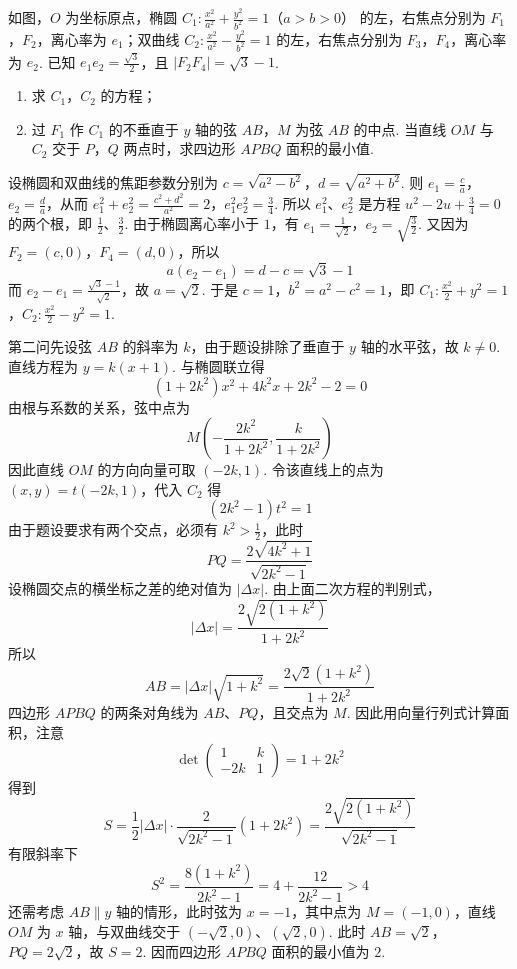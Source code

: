 \begin{problem}
如图，\(O\) 为坐标原点，椭圆 \(C_1: \frac{x^2}{a^2} + \frac{y^2}{b^2} = 1\)（\(a > b > 0\)） 的左，右焦点分别为 \(F_1\)，\(F_2\)，离心率为 \(e_1\)；双曲线 \(C_2: \frac{x^2}{a^2} - \frac{y^2}{b^2} = 1\) 的左，右焦点分别为 \(F_3\)，\(F_4\)，离心率为 \(e_2\). 已知 \(e_1 e_2 = \frac{\sqrt{3}}{2}\)，且 \(|F_2 F_4| = \sqrt{3} - 1\).

\begin{enumerate}
\item 求 \(C_{1}\)，\(C_{2}\) 的方程；
\item 过 \(F_{1}\) 作 \(C_{1}\) 的不垂直于 \(y\) 轴的弦 \(AB\)，\(M\) 为弦 \(AB\) 的中点. 当直线 \(OM\) 与 \(C_{2}\) 交于 \(P\)，\(Q\) 两点时，求四边形 \(APBQ\) 面积的最小值.
\end{enumerate}


\begin{solution}
设椭圆和双曲线的焦距参数分别为
\(c=\sqrt{a^2-b^2}\)，\(d=\sqrt{a^2+b^2}\).
则 \(e_1=\frac{c}{a}\)，\(e_2=\frac{d}{a}\)，从而
\(e_1^2+e_2^2=\frac{c^2+d^2}{a^2}=2\)，\(e_1^2e_2^2=\frac34\).
所以 \(e_1^2\)、\(e_2^2\) 是方程 \(u^2-2u+\frac34=0\) 的两个根，即 \(\frac12\)、\(\frac32\). 由于椭圆离心率小于 \(1\)，有
\(e_1=\frac{1}{\sqrt2}\)，\(e_2=\sqrt{\frac32}\).
又因为 \(F_2=(c,0)\)，\(F_4=(d,0)\)，所以
\[
a(e_2-e_1)=d-c=\sqrt3-1
\]
而 \(e_2-e_1=\frac{\sqrt3-1}{\sqrt2}\)，故 \(a=\sqrt2\). 于是 \(c=1\)，\(b^2=a^2-c^2=1\)，即
\(C_1:\frac{x^2}{2}+y^2=1\)，\(C_2:\frac{x^2}{2}-y^2=1\).

第二问先设弦 \(AB\) 的斜率为 \(k\)，由于题设排除了垂直于 \(y\) 轴的水平弦，故 \(k\ne0\). 直线方程为 \(y=k(x+1)\). 与椭圆联立得
\[
(1+2k^2)x^2+4k^2x+2k^2-2=0
\]
由根与系数的关系，弦中点为
\[
M\left(-\frac{2k^2}{1+2k^2},\frac{k}{1+2k^2}\right)
\]
因此直线 \(OM\) 的方向向量可取 \((-2k,1)\). 令该直线上的点为 \((x,y)=t(-2k,1)\)，代入 \(C_2\) 得
\[
(2k^2-1)t^2=1
\]
由于题设要求有两个交点，必须有 \(k^2>\frac12\)，此时
\[
PQ=\frac{2\sqrt{4k^2+1}}{\sqrt{2k^2-1}}
\]
设椭圆交点的横坐标之差的绝对值为 \(|\Delta x|\). 由上面二次方程的判别式，
\[
|\Delta x|=\frac{2\sqrt{2(1+k^2)}}{1+2k^2}
\]
所以
\[
AB=|\Delta x|\sqrt{1+k^2}=\frac{2\sqrt2(1+k^2)}{1+2k^2}
\]
四边形 \(APBQ\) 的两条对角线为 \(AB\)、\(PQ\)，且交点为 \(M\). 因此用向量行列式计算面积，注意
\[
\det\begin{pmatrix}1&k\\-2k&1\end{pmatrix}=1+2k^2
\]
得到
\[
S=\frac12|\Delta x|\cdot\frac{2}{\sqrt{2k^2-1}}(1+2k^2)
=\frac{2\sqrt{2(1+k^2)}}{\sqrt{2k^2-1}}
\]
有限斜率下
\[
S^2=\frac{8(1+k^2)}{2k^2-1}=4+\frac{12}{2k^2-1}>4
\]
还需考虑 \(AB\parallel y\) 轴的情形，此时弦为 \(x=-1\)，其中点为 \(M=(-1,0)\)，直线 \(OM\) 为 \(x\) 轴，与双曲线交于 \((-\sqrt2,0)\)、\((\sqrt2,0)\). 此时 \(AB=\sqrt2\)，\(PQ=2\sqrt2\)，故 \(S=2\). 因而四边形 \(APBQ\) 面积的最小值为 \(2\).
\end{solution}
\end{problem}

